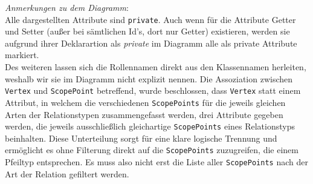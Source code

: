 \documentclass[enabledeprecatedfontcommands,fontsize=11pt,paper=a4,twoside]{scrartcl}
\begin{document}
\textit{Anmerkungen zu dem Diagramm}: \\
Alle dargestellten Attribute sind \texttt{private}. Auch wenn für die Attribute Getter und Setter (außer bei sämtlichen Id's, dort nur Getter) existieren, werden sie aufgrund ihrer Deklarartion als \textit{private} im Diagramm alle als private Attribute markiert. \\
Des weiteren lassen sich die Rollennamen direkt aus den Klassennamen herleiten, weshalb wir sie im Diagramm nicht explizit nennen. Die Assoziation zwischen \texttt{Vertex} und \texttt{ScopePoint} betreffend, wurde beschlossen, dass \texttt{Vertex} statt einem Attribut, in welchem die verschiedenen \texttt{ScopePoints} für die jeweils gleichen Arten der Relationstypen zusammengefasst werden, drei Attribute gegeben werden, die jeweils ausschließlich gleichartige \texttt{ScopePoints} eines Relationstyps beinhalten. Diese Unterteilung sorgt für eine klare logische Trennung und ermöglicht es ohne Filterung direkt auf die \texttt{ScopePoints} zuzugreifen, die einem Pfeiltyp entsprechen. Es muss also nicht erst die Liste aller \texttt{ScopePoints} nach der Art der Relation gefiltert werden.\\
\end{document}
